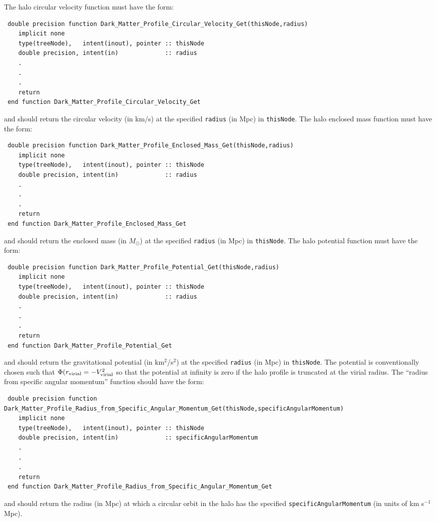 The halo circular velocity function must have the form:
\begin{verbatim}
 double precision function Dark_Matter_Profile_Circular_Velocity_Get(thisNode,radius)
    implicit none
    type(treeNode),   intent(inout), pointer :: thisNode
    double precision, intent(in)             :: radius
    .
    .
    .
    return
 end function Dark_Matter_Profile_Circular_Velocity_Get
\end{verbatim}
and should return the circular velocity (in km/s) at the specified {\tt radius} (in Mpc) in {\tt thisNode}. 
The halo enclosed mass function must have the form:
\begin{verbatim}
 double precision function Dark_Matter_Profile_Enclosed_Mass_Get(thisNode,radius)
    implicit none
    type(treeNode),   intent(inout), pointer :: thisNode
    double precision, intent(in)             :: radius
    .
    .
    .
    return
 end function Dark_Matter_Profile_Enclosed_Mass_Get
\end{verbatim}
and should return the enclosed mass (in $M_\odot$) at the specified {\tt radius} (in Mpc) in {\tt thisNode}. The halo potential function must have the form:
\begin{verbatim}
 double precision function Dark_Matter_Profile_Potential_Get(thisNode,radius)
    implicit none
    type(treeNode),   intent(inout), pointer :: thisNode
    double precision, intent(in)             :: radius
    .
    .
    .
    return
 end function Dark_Matter_Profile_Potential_Get
\end{verbatim}
and should return the gravitational potential (in km$^2$/s$^2$) at the specified {\tt radius} (in Mpc) in {\tt thisNode}. The potential is conventionally chosen such that $\Phi(r_{\rm virial}=-V_{\rm virial}^2$ so that the potential at infinity is zero if the halo profile is truncated at the virial radius. The ``radius from specific angular momentum'' function should have the form:
\begin{verbatim}
 double precision function Dark_Matter_Profile_Radius_from_Specific_Angular_Momentum_Get(thisNode,specificAngularMomentum)
    implicit none
    type(treeNode),   intent(inout), pointer :: thisNode
    double precision, intent(in)             :: specificAngularMomentum
    .
    .
    .
    return
 end function Dark_Matter_Profile_Radius_from_Specific_Angular_Momentum_Get
\end{verbatim}
and should return the radius (in Mpc) at which a circular orbit in the halo has the specified {\tt specificAngularMomentum} (in units of km s$^{-1}$ Mpc).

